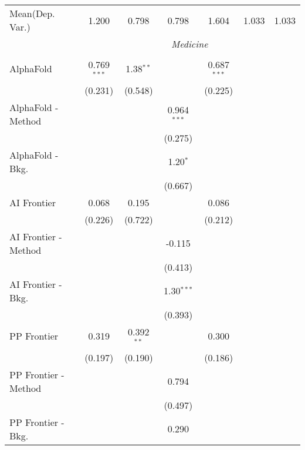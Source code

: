 \begin{tabular}{lcccccc}
Mean(Dep. Var.) & 1.200 & 0.798 & 0.798 & 1.604 & 1.033 & 1.033 \\
 & \multicolumn{6}{c}{\textit{Medicine}} \\ \\
   AlphaFold            & 0.769$^{***}$ & 1.38$^{**}$  &               & 0.687$^{***}$ &        &   \\   
                        & (0.231)       & (0.548)      &               & (0.225)       &        &   \\   
   AlphaFold - Method   &               &              & 0.964$^{***}$ &               &        &   \\   
                        &               &              & (0.275)       &               &        &   \\   
   AlphaFold - Bkg.     &               &              & 1.20$^{*}$    &               &        &   \\   
                        &               &              & (0.667)       &               &        &   \\   
   AI Frontier          & 0.068         & 0.195        &               & 0.086         &        &   \\   
                        & (0.226)       & (0.722)      &               & (0.212)       &        &   \\   
   AI Frontier - Method &               &              & -0.115        &               &        &   \\   
                        &               &              & (0.413)       &               &        &   \\   
   AI Frontier - Bkg.   &               &              & 1.30$^{***}$  &               &        &   \\   
                        &               &              & (0.393)       &               &        &   \\   
   PP Frontier          & 0.319         & 0.392$^{**}$ &               & 0.300         &        &   \\   
                        & (0.197)       & (0.190)      &               & (0.186)       &        &   \\   
   PP Frontier - Method &               &              & 0.794         &               &        &   \\   
                        &               &              & (0.497)       &               &        &   \\   
   PP Frontier - Bkg.   &               &              & 0.290         &               &        &   \\   

\end{tabular}
